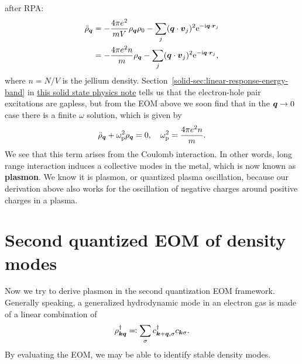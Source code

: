 \documentclass[hyperref, a4paper]{article}
\newcommand*{\ii}{\mathrm{i}}
\newcommand*{\ee}{\mathrm{e}}
\newcommand*{\concept}[1]{{\textbf{#1}}}
\newcommand{\soliddoc}{\href{../solid/solid.pdf}{this solid state physics note}}
\begin{document}
after RPA:
\begin{equation}
    \begin{aligned}
        \ddot{\rho}_{\vb*{q}} &= - \frac{4 \pi e^2}{mV} \rho_{\vb*{q}} \rho_{0} - \sum_j (\vb*{q} \cdot \vb*{v}_j)^2 \ee^{- \ii \vb*{q} \cdot \vb*{r}_j} \\
        &= - \frac{4 \pi e^2 n}{m} \rho_{\vb*{q}} - \sum_j (\vb*{q} \cdot \vb*{v}_j)^2 \ee^{- \ii \vb*{q} \cdot \vb*{r}_j} ,
    \end{aligned}
\end{equation}  
where $n = N / V$ is the jellium density. Section~\eqref{solid-sec:linear-response-energy-band} in \soliddoc{} 
tells us that the electron-hole pair excitations are gapless, but from the EOM above we soon find that in the 
$\vb*{q} \to 0$ case there is a finite $\omega$ solution, which is given by 
\begin{equation}
    \ddot{\rho}_{\vb*{q}} + \omega_\text{p}^2 \rho_{\vb*{q}} = 0, \quad \omega_\text{p}^2 = \frac{4 \pi e^2 n}{m}.
\end{equation}
We see that this term arises from the Coulomb interaction. In other words, long range interaction induces a 
collective modes in the metal, which is now known as \concept{plasmon}. We know it is plasmon, or quantized 
plasma oscillation, because our derivation above also works for the oscillation of negative charges around 
positive charges in a plasma.

\section{Second quantized EOM of density modes}\label{sec:second-quantization}

Now we try to derive plasmon in the second quantization EOM framework. Generally speaking, a generalized 
hydrodynamic mode in an electron gas is made of a linear combination of 
\begin{equation}
    \rho_{\vb*{k} \vb*{q}}^\dagger \eqqcolon \sum_\sigma c^\dagger_{\vb*{k} + \vb*{q}, \sigma} c_{\vb*{k} \sigma}.
\end{equation}
By evaluating the EOM, we may be able to identify stable density modes.
\end{document}
